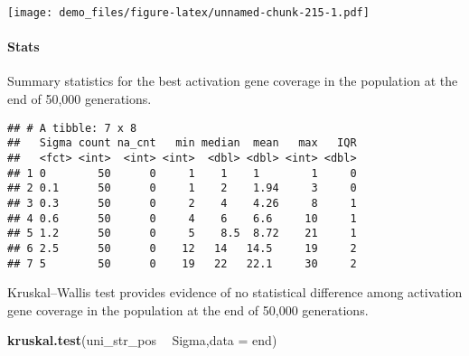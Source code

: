 \documentclass[]{book}
\newenvironment{Shaded}{\begin{snugshade}}{\end{snugshade}}
\newcommand{\DataTypeTok}[1]{\textcolor[rgb]{0.13,0.29,0.53}{#1}}
\newcommand{\KeywordTok}[1]{\textcolor[rgb]{0.13,0.29,0.53}{\textbf{#1}}}
\newcommand{\NormalTok}[1]{#1}
\newcommand{\OperatorTok}[1]{\textcolor[rgb]{0.81,0.36,0.00}{\textbf{#1}}}
\newcommand{\OtherTok}[1]{\textcolor[rgb]{0.56,0.35,0.01}{#1}}
\newcommand{\StringTok}[1]{\textcolor[rgb]{0.31,0.60,0.02}{#1}}
\let\oldparagraph\paragraph
\renewcommand{\paragraph}[1]{\oldparagraph{#1}\mbox{}}
\begin{document}
\texttt{[image: demo\_files/figure-latex/unnamed-chunk-215-1.pdf]}

\hypertarget{stats-41}{%
\paragraph{Stats}\label{stats-41}}

Summary statistics for the best activation gene coverage in the population at the end of 50,000 generations.

\begin{Shaded}
\end{Shaded}

\begin{verbatim}
## # A tibble: 7 x 8
##   Sigma count na_cnt   min median  mean   max   IQR
##   <fct> <int>  <int> <int>  <dbl> <dbl> <int> <dbl>
## 1 0        50      0     1    1    1        1     0
## 2 0.1      50      0     1    2    1.94     3     0
## 3 0.3      50      0     2    4    4.26     8     1
## 4 0.6      50      0     4    6    6.6     10     1
## 5 1.2      50      0     5    8.5  8.72    21     1
## 6 2.5      50      0    12   14   14.5     19     2
## 7 5        50      0    19   22   22.1     30     2
\end{verbatim}

Kruskal--Wallis test provides evidence of no statistical difference among activation gene coverage in the population at the end of 50,000 generations.

\begin{Shaded}
\begin{Highlighting}[]
\KeywordTok{kruskal.test}\NormalTok{(uni_str_pos }\OperatorTok{~}\StringTok{ }\NormalTok{Sigma,}\DataTypeTok{data =}\NormalTok{ end)}
\end{Highlighting}
\end{Shaded}
\end{document}
